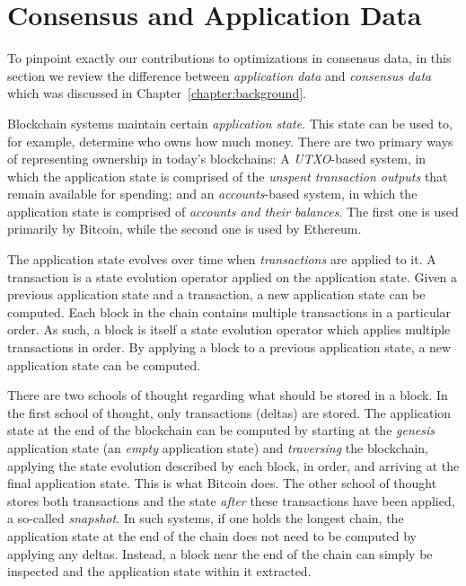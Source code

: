 \section{Consensus and Application Data}

To pinpoint exactly our contributions to optimizations in
consensus data, in this section we review the difference between
\emph{application data} and \emph{consensus data} which was
discussed in Chapter~\ref{chapter:background}.

Blockchain systems maintain certain \emph{application state}.
This state can be used to, for example, determine who owns how much
money. There are two primary ways of representing ownership
in today's blockchains: A \emph{UTXO}-based system, in which the application
state is comprised of the \emph{unspent transaction outputs} that
remain available for spending; and an \emph{accounts}-based system,
in which the application state is comprised of \emph{accounts and
their balances}. The first one is used primarily by Bitcoin, while
the second one is used by Ethereum.

The application state evolves over time when \emph{transactions} are applied
to it. A transaction is a state evolution operator applied on the application
state. Given a previous application state and a transaction, a new application
state can be computed. Each block in the chain contains multiple transactions
in a particular order. As such, a block is itself a state evolution operator
which applies multiple transactions in order. By applying a block to a previous
application state, a new application state can be computed.

There are two schools of thought regarding what should be stored in a
block. In the first school of thought, only transactions (deltas) are stored. The
application state at the end of the blockchain can be computed by
starting at the \emph{genesis} application state (an \emph{empty} application
state) and \emph{traversing} the blockchain, applying the state evolution
described by each block, in order, and arriving at the final application state.
This is what Bitcoin does. The other school of thought stores both transactions
and the state \emph{after} these transactions have been applied, a so-called
\emph{snapshot}. In such
systems, if one holds the longest chain, the application state at the end of
the chain does not need to be computed by applying any deltas.
Instead, a block near the end of the chain can simply be inspected and the application state
within it extracted.

